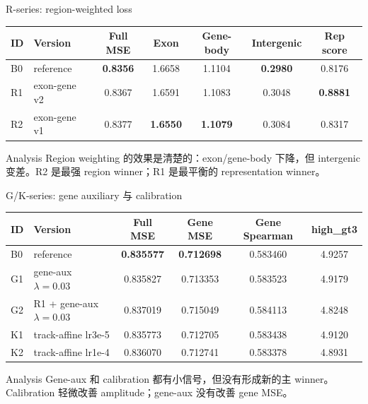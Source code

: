 \documentclass[UTF8,aspectratio=169,10pt]{ctexbeamer}
\begin{document}
\begin{frame}{R-series: region-weighted loss}
  \centering
  \begin{tabular}{llccccc}
    \toprule
    ID & Version & Full MSE & Exon & Gene-body & Intergenic & Rep score \\
    \midrule
    B0 & reference & \textbf{0.8356} & 1.6658 & 1.1104 & \textbf{0.2980} & 0.8176 \\
    R1 & exon-gene v2 & 0.8367 & 1.6591 & 1.1083 & 0.3048 & \textbf{0.8881} \\
    R2 & exon-gene v1 & 0.8377 & \textbf{1.6550} & \textbf{1.1079} & 0.3084 & 0.8317 \\
    \bottomrule
  \end{tabular}

  \vspace{0.8em}
  \begin{block}{Analysis}
    Region weighting 的效果是清楚的：exon/gene-body 下降，但 intergenic 变差。R2 是最强 region winner；R1 是最平衡的 representation winner。
  \end{block}
\end{frame}

\begin{frame}{G/K-series: gene auxiliary 与 calibration}
  \centering
  \begin{tabular}{llcccc}
    \toprule
    ID & Version & Full MSE & Gene MSE & Gene Spearman & high\_gt3 \\
    \midrule
    B0 & reference & \textbf{0.835577} & \textbf{0.712698} & 0.583460 & 4.9257 \\
    G1 & gene-aux $\lambda=0.03$ & 0.835827 & 0.713353 & 0.583523 & 4.9179 \\
    G2 & R1 + gene-aux $\lambda=0.03$ & 0.837019 & 0.715049 & 0.584113 & 4.8248 \\
    K1 & track-affine lr3e-5 & 0.835773 & 0.712705 & 0.583438 & 4.9120 \\
    K2 & track-affine lr1e-4 & 0.836070 & 0.712741 & 0.583378 & 4.8931 \\
    \bottomrule
  \end{tabular}

  \vspace{0.8em}
  \begin{block}{Analysis}
    Gene-aux 和 calibration 都有小信号，但没有形成新的主 winner。Calibration 轻微改善 amplitude；gene-aux 没有改善 gene MSE。
  \end{block}
\end{frame}
\end{document}
